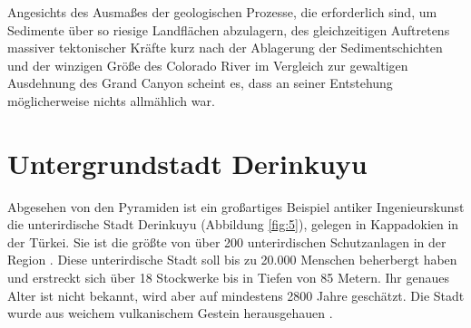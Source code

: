 \documentclass[10pt,twocolumn,letterpaper]{article}
\begin{document}
Angesichts des Ausmaßes der geologischen Prozesse, die erforderlich sind, um Sedimente über so riesige Landflächen abzulagern, des gleichzeitigen Auftretens massiver tektonischer Kräfte kurz nach der Ablagerung der Sedimentschichten und der winzigen Größe des Colorado River im Vergleich zur gewaltigen Ausdehnung des Grand Canyon scheint es, dass an seiner Entstehung möglicherweise nichts allmählich war.

\section{Untergrundstadt Derinkuyu}

Abgesehen von den Pyramiden ist ein großartiges Beispiel antiker Ingenieurskunst die unterirdische Stadt Derinkuyu (Abbildung \ref{fig:5}), gelegen in Kappadokien in der Türkei. Sie ist die größte von über 200 unterirdischen Schutzanlagen in der Region \cite{54}. Diese unterirdische Stadt soll bis zu 20.000 Menschen beherbergt haben und erstreckt sich über 18 Stockwerke bis in Tiefen von 85 Metern. Ihr genaues Alter ist nicht bekannt, wird aber auf mindestens 2800 Jahre geschätzt. Die Stadt wurde aus weichem vulkanischem Gestein herausgehauen \cite{52, 53}.
\end{document}

